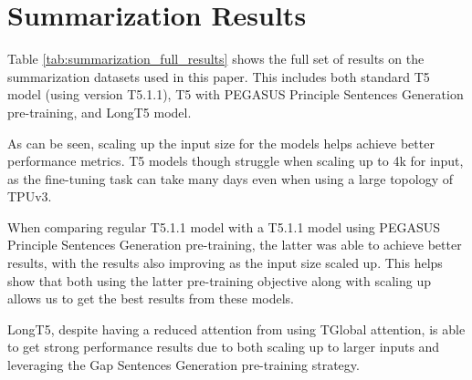 \documentclass[11pt]{article}
\begin{document}
\clearpage

\appendix

\section{Summarization Results}\label{sec:sum_appendix}


Table \ref{tab:summarization_full_results} shows the full set of results on the summarization datasets used in this paper.
This includes both standard T5 model (using version T5.1.1), T5 with PEGASUS Principle Sentences Generation pre-training, and LongT5 model.

As can be seen, scaling up the input size for the models helps achieve better performance metrics.
T5 models though struggle when scaling up to 4k for input, as the fine-tuning task can take many days even when using a large topology of TPUv3.

When comparing regular T5.1.1 model with a T5.1.1 model using PEGASUS Principle Sentences Generation pre-training, the latter was able to achieve better results, with the results also improving as the input size scaled up.
This helps show that both using the latter pre-training objective along with scaling up allows us to get the best results from these models.

LongT5, despite having a reduced attention from using TGlobal attention, is able to get strong performance results due to both scaling up to larger inputs and leveraging the Gap Sentences Generation pre-training strategy.
\end{document}
